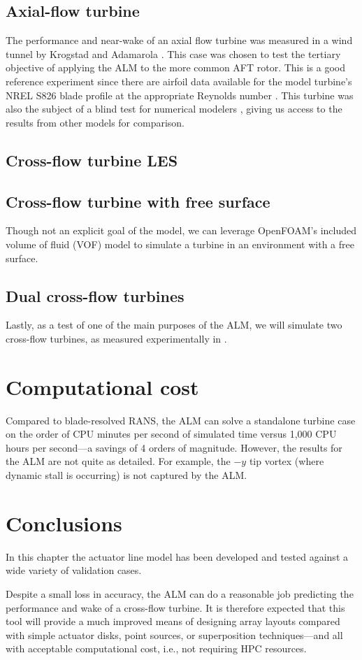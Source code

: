 \subsection{Axial-flow turbine}

The performance and near-wake of an axial flow turbine was measured in a wind
tunnel by Krogstad and Adamarola \cite{Krogstad2012a}. This case was chosen to
test the tertiary objective of applying the ALM to the more common AFT rotor.
This is a good reference experiment since there are airfoil data available for
the model turbine's NREL S826 blade profile at the appropriate Reynolds number
\cite{Ostavan2013}. This turbine was also the subject of a blind test for
numerical modelers \cite{Krogstad2013}, giving us access to the results from
other models for comparison.


\subsection{Cross-flow turbine LES}


\subsection{Cross-flow turbine with free surface}

Though not an explicit goal of the model, we can leverage OpenFOAM's included
volume of fluid (VOF) model to simulate a turbine in an environment with a free
surface.


\subsection{Dual cross-flow turbines}

Lastly, as a test of one of the main purposes of the ALM, we will simulate two
cross-flow turbines, as measured experimentally in \cite{Li2010}.


\section{Computational cost}

Compared to blade-resolved RANS, the ALM can solve a standalone turbine case on
the order of CPU minutes per second of simulated time versus 1,000 CPU hours per
second---a savings of 4 orders of magnitude. However, the results for the ALM
are not quite as detailed. For example, the $-y$ tip vortex (where dynamic stall
is occurring) is not captured by the ALM.


\section{Conclusions}

In this chapter the actuator line model has been developed and tested against a
wide variety of validation cases.

Despite a small loss in accuracy, the ALM can do a reasonable job predicting the
performance and wake of a cross-flow turbine. It is therefore expected that this
tool will provide a much improved means of designing array layouts compared with
simple actuator disks, point sources, or superposition techniques---and all with
acceptable computational cost, i.e., not requiring HPC resources.